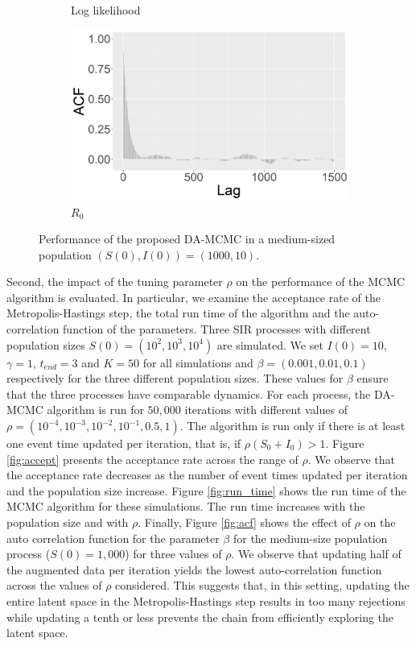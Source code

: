 \documentclass[11pt]{article}
\begin{document}
\begin{figure}
\begin{subfigure}[b]{0.41\textwidth}
			\caption{Log likelihood}
			\label{fig:traceplot_loglik}
		\end{subfigure}
		\hfill
		\begin{subfigure}[b]{0.41\textwidth}
			\centering
			\includegraphics[width=\textwidth]{E1_burn_gamma_acf}
			\caption{$R_0$}
			\label{fig:traceplot_R0}
		\end{subfigure}
		\caption{Performance of the proposed DA-MCMC in a medium-sized population $(S(0), I(0)) = (1000, 10)$.}
		\label{fig:E1}
	\end{figure}
	
	Second, the impact of the tuning parameter $\rho$ on the performance of the MCMC algorithm is evaluated. In particular, we examine the acceptance rate of the Metropolis-Hastings step, the total run time of the algorithm and the auto-correlation function of the parameters.
	Three SIR processes with different population sizes $S(0) = (10^2, 10^3, 10^4)$ are simulated. We set $I(0) =10$, $\gamma=1$, $t_{end} = 3$ and $K = 50$ for all simulations and $\beta = (0.001, 0.01, 0.1)$ respectively for the three different population sizes. These values for $\beta$ ensure that the three processes have comparable dynamics. For each process, the DA-MCMC algorithm is run for $50,000$ iterations with different values of $\rho = (10^{-4}, 10^{-3}, 10^{-2}, 10^{-1}, 0.5, 1)$. The algorithm is run only if there is at least one event time updated per iteration, that is, if $\rho(S_0+I_0)>1$.
	Figure \ref{fig:accept} presents the acceptance rate across the range of $\rho$.  We observe that the acceptance rate decreases as the number of event times updated per iteration and the population size increase.
	Figure \ref{fig:run_time} shows the run time of the MCMC algorithm for these simulations. The run time increases with the population size and with $\rho$.
	Finally, Figure \ref{fig:acf} shows the effect of $\rho$ on the auto correlation function for the parameter $\beta$ for the medium-size population process ($S(0) = 1,000$) for three values of $\rho$. We observe that updating half of the augmented data per iteration yields the lowest auto-correlation function across the values of $\rho$ considered. This suggests that, in this setting, updating the entire latent space in the Metropolis-Hastings step results in too many rejections while updating a tenth or less prevents the chain from efficiently exploring the latent space.
	
\end{document}
